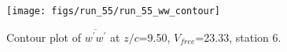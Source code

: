 \begin{figure}[H]
\centering
\texttt{[image: figs/run\_55/run\_55\_ww\_contour]}
\caption{Contour plot of $\overline{w^\prime w^\prime}$ at $z/c$=9.50, $V_{free}$=23.33, station 6.}
\label{fig:run_55_ww_contour}
\end{figure}


